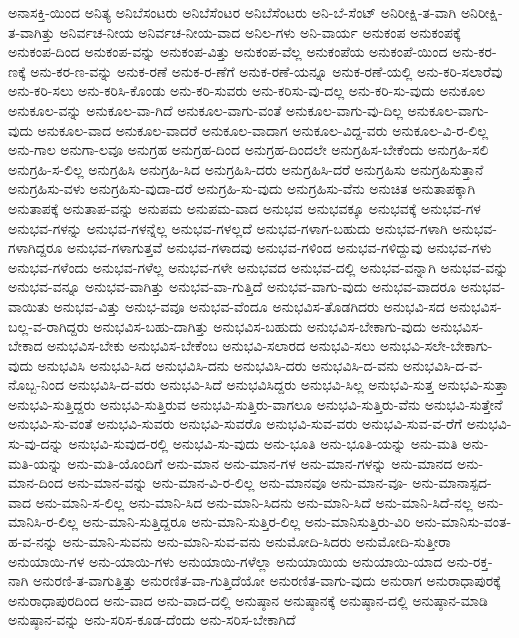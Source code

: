 {ಅನಾಸಕ್ತಿ-ಯಿಂದ
ಅನಿತ್ಯ
ಅನಿಬೆಸಂಟರು
ಅನಿಬೆಸೆಂಟರ
ಅನಿಬೆಸೆಂಟರು
ಅನಿ-ಬೆ-ಸೆಂಟ್
ಅನಿರೀಕ್ಷಿ-ತ-ವಾಗಿ
ಅನಿರೀಕ್ಷಿ-ತ-ವಾಗಿತ್ತು
ಅನಿರ್ವಚ-ನೀಯ
ಅನಿರ್ವಚ-ನೀಯ-ವಾದ
ಅನಿಲ-ಗಳು
ಅನಿ-ವಾರ್ಯ
ಅನುಕಂಪ
ಅನುಕಂಪಕ್ಕೆ
ಅನುಕಂಪ-ದಿಂದ
ಅನುಕಂಪ-ವನ್ನು
ಅನುಕಂಪ-ವಿತ್ತು
ಅನುಕಂಪ-ವೆಲ್ಲ
ಅನುಕಂಪೆಯ
ಅನುಕಂಪೆ-ಯಿಂದ
ಅನು-ಕರ-ಣಕ್ಕೆ
ಅನು-ಕರ-ಣ-ವನ್ನು
ಅನುಕ-ರಣೆ
ಅನುಕ-ರ-ಣೆಗೆ
ಅನುಕ-ರಣೆ-ಯನ್ನೂ
ಅನುಕ-ರಣೆ-ಯಲ್ಲಿ
ಅನು-ಕರಿ-ಸಲಾರೆವು
ಅನು-ಕರಿ-ಸಲು
ಅನು-ಕರಿಸಿ-ಕೊಂಡು
ಅನು-ಕರಿ-ಸುವರು
ಅನು-ಕರಿಸು-ವು-ದಲ್ಲ
ಅನು-ಕರಿ-ಸು-ವುದು
ಅನುಕೂಲ
ಅನುಕೂಲ-ವನ್ನು
ಅನುಕೂಲ-ವಾ-ಗಿದೆ
ಅನುಕೂಲ-ವಾಗು-ವಂತೆ
ಅನುಕೂಲ-ವಾಗು-ವು-ದಿಲ್ಲ
ಅನುಕೂಲ-ವಾಗು-ವುದು
ಅನುಕೂಲ-ವಾದ
ಅನುಕೂಲ-ವಾದರೆ
ಅನುಕೂಲ-ವಾದಾಗ
ಅನುಕೂಲ-ವಿದ್ದ-ವರು
ಅನುಕೂಲ-ವಿ-ರ-ಲಿಲ್ಲ
ಅನು-ಗಾಲ
ಅನುಗಾ-ಲವೂ
ಅನುಗ್ರಹ
ಅನುಗ್ರಹ-ದಿಂದ
ಅನುಗ್ರಹ-ದಿಂದಲೇ
ಅನುಗ್ರಹಿಸ-ಬೇಕೆಂದು
ಅನುಗ್ರಹಿ-ಸಲಿ
ಅನುಗ್ರಹಿ-ಸ-ಲಿಲ್ಲ
ಅನುಗ್ರಹಿಸಿ
ಅನುಗ್ರಹಿ-ಸಿದ
ಅನುಗ್ರಹಿಸಿ-ದರು
ಅನುಗ್ರಹಿಸಿ-ದರೆ
ಅನುಗ್ರಹಿಸು
ಅನುಗ್ರಹಿಸುತ್ತಾನೆ
ಅನುಗ್ರಹಿಸು-ವಳು
ಅನುಗ್ರಹಿಸು-ವುದಾ-ದರೆ
ಅನುಗ್ರಹಿ-ಸು-ವುದು
ಅನುಗ್ರಹಿಸು-ವೆನು
ಅನುಚಿತ
ಅನುತಾಪಕ್ಕಾಗಿ
ಅನುತಾಪಕ್ಕೆ
ಅನುತಾಪ-ವನ್ನು
ಅನುಪಮ
ಅನುಪಮ-ವಾದ
ಅನುಭವ
ಅನುಭವಕ್ಕೂ
ಅನುಭವಕ್ಕೆ
ಅನುಭವ-ಗಳ
ಅನುಭವ-ಗಳನ್ನು
ಅನುಭವ-ಗಳನ್ನೆಲ್ಲ
ಅನುಭವ-ಗಳಲ್ಲದೆ
ಅನುಭವ-ಗಳಾಗ-ಬಹುದು
ಅನುಭವ-ಗಳಾಗಿ
ಅನುಭವ-ಗಳಾಗಿದ್ದರೂ
ಅನುಭವ-ಗಳಾಗುತ್ತವೆ
ಅನುಭವ-ಗಳಾದವು
ಅನುಭವ-ಗಳಿಂದ
ಅನುಭವ-ಗಳಿದ್ದುವು
ಅನುಭವ-ಗಳು
ಅನುಭವ-ಗಳೆಂದು
ಅನುಭವ-ಗಳೆಲ್ಲ
ಅನುಭವ-ಗಳೇ
ಅನುಭವದ
ಅನುಭವ-ದಲ್ಲಿ
ಅನುಭವ-ವನ್ನಾಗಿ
ಅನುಭವ-ವನ್ನು
ಅನುಭವ-ವನ್ನೂ
ಅನುಭವ-ವಾಗಿತ್ತು
ಅನುಭವ-ವಾ-ಗುತ್ತಿದೆ
ಅನುಭವ-ವಾಗು-ವುದು
ಅನುಭವ-ವಾದರೂ
ಅನುಭವ-ವಾಯಿತು
ಅನುಭವ-ವಿತ್ತು
ಅನುಭ-ವವೂ
ಅನುಭವ-ವೆಂದೂ
ಅನುಭವಿಸ-ತೊಡಗಿದರು
ಅನುಭವಿ-ಸದ
ಅನುಭವಿಸ-ಬಲ್ಲ-ವ-ರಾಗಿದ್ದರು
ಅನುಭವಿಸ-ಬಹು-ದಾಗಿತ್ತು
ಅನುಭವಿಸ-ಬಹುದು
ಅನುಭವಿಸ-ಬೇಕಾಗು-ವುದು
ಅನುಭವಿಸ-ಬೇಕಾದ
ಅನುಭವಿಸ-ಬೇಕು
ಅನುಭವಿಸ-ಬೇಕೆಂಬ
ಅನುಭವಿ-ಸಲಾರದ
ಅನುಭವಿ-ಸಲು
ಅನುಭವಿ-ಸಲೇ-ಬೇಕಾಗು-ವುದು
ಅನುಭವಿಸಿ
ಅನುಭವಿ-ಸಿದ
ಅನುಭವಿಸಿ-ದನು
ಅನುಭವಿಸಿ-ದರು
ಅನುಭವಿಸಿ-ದ-ವನು
ಅನುಭವಿಸಿ-ದ-ವ-ನೊಬ್ಬ-ನಿಂದ
ಅನುಭವಿಸಿ-ದ-ವರು
ಅನುಭವಿ-ಸಿದೆ
ಅನುಭವಿಸಿದ್ದರು
ಅನುಭವಿ-ಸಿಲ್ಲ
ಅನುಭವಿ-ಸುತ್ತ
ಅನುಭವಿ-ಸುತ್ತಾ
ಅನುಭವಿ-ಸುತ್ತಿದ್ದರು
ಅನುಭವಿ-ಸುತ್ತಿರುವ
ಅನುಭವಿ-ಸುತ್ತಿರು-ವಾಗಲೂ
ಅನುಭವಿ-ಸುತ್ತಿರು-ವೆನು
ಅನುಭವಿ-ಸುತ್ತೇನೆ
ಅನುಭವಿ-ಸು-ವಂತೆ
ಅನುಭವಿ-ಸುವರು
ಅನುಭವಿ-ಸುವರೊ
ಅನುಭವಿ-ಸುವ-ವರು
ಅನುಭವಿ-ಸುವ-ವ-ರೆಗೆ
ಅನುಭವಿ-ಸು-ವು-ದನ್ನು
ಅನುಭವಿ-ಸುವುದ-ರಲ್ಲಿ
ಅನುಭವಿ-ಸು-ವುದು
ಅನು-ಭೂತಿ
ಅನು-ಭೂತಿ-ಯನ್ನು
ಅನು-ಮತಿ
ಅನು-ಮತಿ-ಯನ್ನು
ಅನು-ಮತಿ-ಯೊಂದಿಗೆ
ಅನು-ಮಾನ
ಅನು-ಮಾನ-ಗಳ
ಅನು-ಮಾನ-ಗಳನ್ನು
ಅನು-ಮಾನದ
ಅನು-ಮಾನ-ದಿಂದ
ಅನು-ಮಾನ-ವನ್ನು
ಅನು-ಮಾನ-ವಿ-ರ-ಲಿಲ್ಲ
ಅನು-ಮಾನವೂ
ಅನು-ಮಾನ-ವೂ-
ಅನು-ಮಾನಾಸ್ಪದ-ವಾದ
ಅನು-ಮಾನಿ-ಸ-ಲಿಲ್ಲ
ಅನು-ಮಾನಿ-ಸಿದ
ಅನು-ಮಾನಿ-ಸಿದನು
ಅನು-ಮಾನಿ-ಸಿದೆ
ಅನು-ಮಾನಿ-ಸಿದೆ-ನಲ್ಲ
ಅನು-ಮಾನಿಸಿ-ರ-ಲಿಲ್ಲ
ಅನು-ಮಾನಿ-ಸುತ್ತಿದ್ದರೂ
ಅನು-ಮಾನಿ-ಸುತ್ತಿರ-ಲಿಲ್ಲ
ಅನು-ಮಾನಿಸುತ್ತಿರು-ವಿರಿ
ಅನು-ಮಾನಿಸು-ವಂತ-ಹ-ವ-ನನ್ನು
ಅನು-ಮಾನಿ-ಸುವನು
ಅನು-ಮಾನಿ-ಸುವ-ವನು
ಅನುಮೋದಿ-ಸಿದರು
ಅನುಮೋದಿ-ಸುತ್ತೀರಾ
ಅನುಯಾಯಿ-ಗಳ
ಅನು-ಯಾಯಿ-ಗಳು
ಅನುಯಾಯಿ-ಗಳೆಲ್ಲಾ
ಅನುಯಾಯಿಯ
ಅನುಯಾಯಿ-ಯಾದ
ಅನು-ರಕ್ತ-ನಾಗಿ
ಅನುರಣಿ-ತ-ವಾಗುತ್ತಿತ್ತು
ಅನುರಣಿತ-ವಾ-ಗುತ್ತಿದೆಯೋ
ಅನುರಣಿತ-ವಾಗು-ವುದು
ಅನುರಾಗ
ಅನುರಾಧಾಪುರಕ್ಕೆ
ಅನುರಾಧಾಪುರದಿಂದ
ಅನು-ವಾದ
ಅನು-ವಾದ-ದಲ್ಲಿ
ಅನುಷ್ಠಾನ
ಅನುಷ್ಠಾನಕ್ಕೆ
ಅನುಷ್ಠಾನ-ದಲ್ಲಿ
ಅನುಷ್ಠಾನ-ಮಾಡಿ
ಅನುಷ್ಠಾನ-ವನ್ನು
ಅನು-ಸರಿಸ-ಕೂಡ-ದೆಂದು
ಅನು-ಸರಿಸ-ಬೇಕಾಗಿದೆ
}
